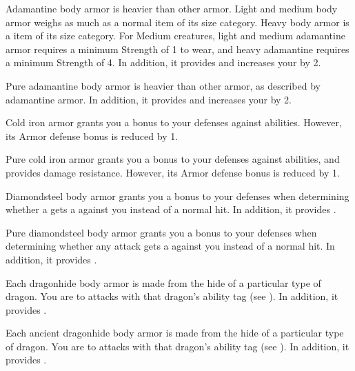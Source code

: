        Adamantine body armor is heavier than other armor.
      Light and medium body armor weighs as much as a normal item of its size category.
      Heavy body armor is a  item of its size category.
      For Medium creatures, light and medium adamantine armor requires a minimum Strength of 1 to wear, and heavy adamantine requires a minimum Strength of 4.
      In addition, it provides   and increases your  by 2.

       Pure adamantine body armor is heavier than other armor, as described by adamantine armor.
      In addition, it provides   and increases your  by 2.

       Cold iron armor grants you a  bonus to your defenses against \magical abilities.
      However, its Armor defense bonus is reduced by 1.

       Pure cold iron armor grants you a  bonus to your defenses against \magical abilities, and provides  damage resistance.
      However, its Armor defense bonus is reduced by 1.

       Diamondsteel body armor grants you a  bonus to your defenses when determining whether a  gets a  against you instead of a normal hit.
      In addition, it provides  .

       Pure diamondsteel body armor grants you a  bonus to your defenses when determining whether any attack gets a  against you instead of a normal hit.
      In addition, it provides  .

       Each dragonhide body armor is made from the hide of a particular type of dragon.
      You are  to attacks with that dragon's ability tag (see ).
      In addition, it provides  .

       Each ancient dragonhide body armor is made from the hide of a particular type of dragon.
      You are  to attacks with that dragon's ability tag (see ).
      In addition, it provides  .

